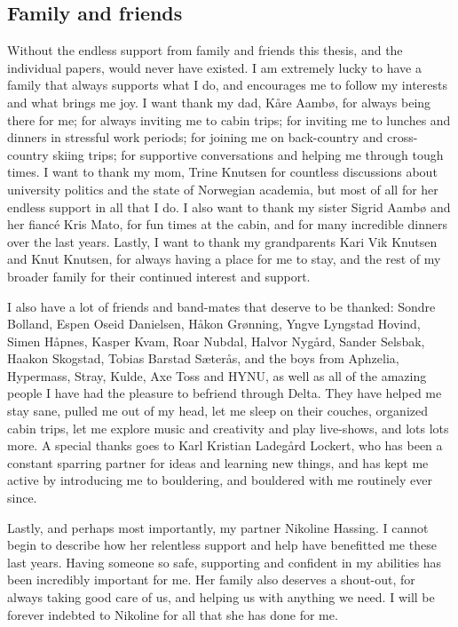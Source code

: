 \subsection*{Family and friends}

Without the endless support from family and friends this thesis, and the individual papers, would never have existed. I am extremely lucky to have a family that always supports what I do, and encourages me to follow my interests and what brings me joy. I want thank my dad, Kåre Aambø, for always being there for me; for always inviting me to cabin trips; for inviting me to lunches and dinners in stressful work periods; for joining me on back-country and cross-country skiing trips; for supportive conversations and helping me through tough times. I want to thank my mom, Trine Knutsen for countless discussions about university politics and the state of Norwegian academia, but most of all for her endless support in all that I do. I also want to thank my sister Sigrid Aambø and her fiancé Kris Mato, for fun times at the cabin, and for many incredible dinners over the last years. Lastly, I want to thank my grandparents Kari Vik Knutsen and Knut Knutsen, for always having a place for me to stay, and the rest of my broader family for their continued interest and support. 

I also have a lot of friends and band-mates that deserve to be thanked: 
Sondre Bolland, 
Espen Oseid Danielsen, 
Håkon Grønning, 
Yngve Lyngstad Hovind, 
Simen Håpnes, 
Kasper Kvam, 
Roar Nubdal, 
Halvor Nygård, 
Sander Selsbak, 
Haakon Skogstad, 
Tobias Barstad Sæterås, 
and the boys from Aphzelia, Hypermass, Stray, Kulde, Axe Toss and HYNU, as well as all of the amazing people I have had the pleasure to befriend through Delta. They have helped me stay sane, pulled me out of my head, let me sleep on their couches, organized cabin trips, let me explore music and creativity and play live-shows, and lots lots more. A special thanks goes to Karl Kristian Ladegård Lockert, who has been a constant sparring partner for ideas and learning new things, and has kept me active by introducing me to bouldering, and bouldered with me routinely ever since. 

Lastly, and perhaps most importantly, my partner Nikoline Hassing. I cannot begin to describe how her relentless support and help have benefitted me these last years. Having someone so safe, supporting and confident in my abilities has been incredibly important for me. Her family also deserves a shout-out, for always taking good care of us, and helping us with anything we need. I will be forever indebted to Nikoline for all that she has done for me. 


